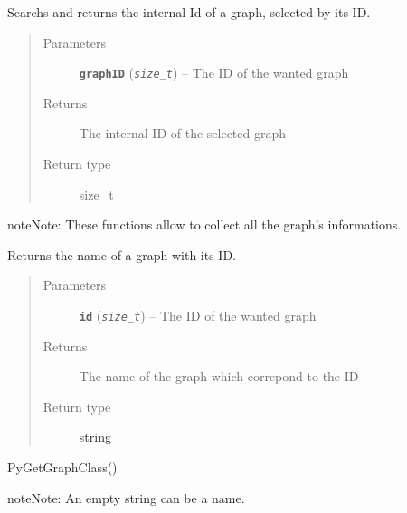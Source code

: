 \documentclass[letterpaper,10pt,english]{sphinxmanual}
\begin{document}

\begin{fulllineitems}
\label{doc:PythonGedLib.PyGetGraphInternalId}
Searchs and returns the internal Id of a graph, selected by its ID.
\begin{quote}\begin{description}
\item[{Parameters}] \leavevmode
\textbf{\texttt{graphID}} (\emph{\texttt{size\_t}}) -- The ID of the wanted graph

\item[{Returns}] \leavevmode
The internal ID of the selected graph

\item[{Return type}] \leavevmode
size\_t

\end{description}\end{quote}

\begin{notice}{note}{Note:}
These functions allow to collect all the graph's informations.
\end{notice}

\end{fulllineitems}


\begin{fulllineitems}
\label{doc:PythonGedLib.PyGetGraphName}
Returns the name of a graph with its ID.
\begin{quote}\begin{description}
\item[{Parameters}] \leavevmode
\textbf{\texttt{id}} (\emph{\texttt{size\_t}}) -- The ID of the wanted graph

\item[{Returns}] \leavevmode
The name of the graph which correpond to the ID

\item[{Return type}] \leavevmode
\href{https://docs.python.org/3/library/string.html\#module-string}{string}

\end{description}\end{quote}




PyGetGraphClass()



\begin{notice}{note}{Note:}
An empty string can be a name.
\end{notice}

\end{fulllineitems}
\end{document}
